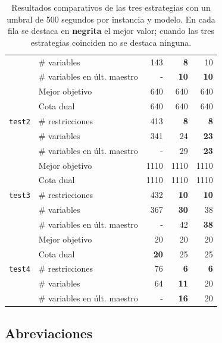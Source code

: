 \documentclass[12pt]{article}
\numberwithin{algorithm}{section}
\begin{document}
\begin{table}[H]
\begin{tabular}{|l|l|r|r|r|}
 & \# variables & 143 & \textbf{8} & 10 \\
 & \# variables en últ. maestro & - & \textbf{10} & \textbf{10} \\
\hline
\multirow{5}{*}{\texttt{test2}}
 & Mejor objetivo & 640 & 640 & 640 \\
 & Cota dual & 640 & 640 & 640 \\
 & \# restricciones & 413 & \textbf{8} & \textbf{8} \\
 & \# variables & 341 & 24 & \textbf{23} \\
 & \# variables en últ. maestro & - & 29 & \textbf{23} \\
\hline
\multirow{5}{*}{\texttt{test3}}
 & Mejor objetivo & 1110 & 1110 & 1110 \\
 & Cota dual & 1110 & 1110 & 1110 \\
 & \# restricciones & 432 & \textbf{10} & \textbf{10} \\
 & \# variables & 367 & \textbf{30} & 38 \\
 & \# variables en últ. maestro & - & 42 & \textbf{38} \\
\hline
\multirow{5}{*}{\texttt{test4}}
 & Mejor objetivo & 20 & 20 & 20 \\
 & Cota dual & \textbf{20} & 25 & 25 \\
 & \# restricciones & 76 & \textbf{6} & \textbf{6} \\
 & \# variables & 64 & \textbf{11} & 20 \\
 & \# variables en últ. maestro & - & \textbf{16} & 20 \\
\hline
\end{tabular}
\caption{Resultados comparativos de las tres estrategias con un umbral de 500 segundos por instancia y modelo. En cada fila se destaca en \textbf{negrita} el mejor valor; cuando las tres estrategias coinciden no se destaca ninguna.}
\label{tabla:comparacion}
\end{table}

\subsection{Abreviaciones}
\end{document}
